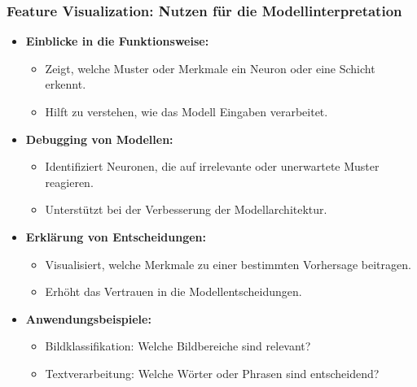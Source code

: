 \documentclass[aspectratio=1610, xcolor=dvipsnames, 9pt]{beamer}
\begin{document}
\begin{frame}
  \frametitle{Feature Visualization: Nutzen für die Modellinterpretation}
  \begin{itemize}
    \item \textbf{Einblicke in die Funktionsweise:}
    \begin{itemize}
      \item Zeigt, welche Muster oder Merkmale ein Neuron oder eine Schicht erkennt.
      \item Hilft zu verstehen, wie das Modell Eingaben verarbeitet.
    \end{itemize}
    \item \textbf{Debugging von Modellen:}
    \begin{itemize}
      \item Identifiziert Neuronen, die auf irrelevante oder unerwartete Muster reagieren.
      \item Unterstützt bei der Verbesserung der Modellarchitektur.
    \end{itemize}
    \item \textbf{Erklärung von Entscheidungen:}
    \begin{itemize}
      \item Visualisiert, welche Merkmale zu einer bestimmten Vorhersage beitragen.
      \item Erhöht das Vertrauen in die Modellentscheidungen.
    \end{itemize}
    \item \textbf{Anwendungsbeispiele:}
    \begin{itemize}
      \item Bildklassifikation: Welche Bildbereiche sind relevant?
      \item Textverarbeitung: Welche Wörter oder Phrasen sind entscheidend?
    \end{itemize}
  \end{itemize}
\end{frame}
\end{document}

